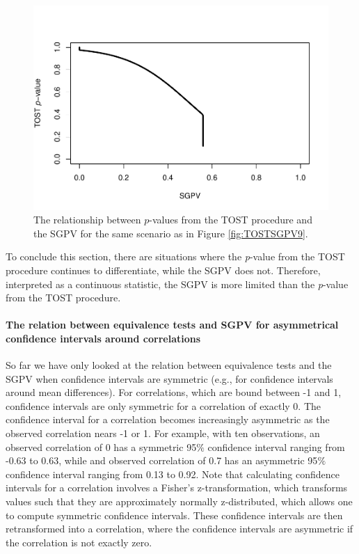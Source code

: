 \documentclass[
  english,
  man]{apa6}
\let\oldparagraph\paragraph
\renewcommand{\paragraph}[1]{\oldparagraph{#1}\mbox{}}
\begin{document}
\begin{figure}

{\centering \includegraphics[height=0.94\textheight]{chp5_format-Rmd_bib_files/figure-latex/TOSTSGPV10-1} 

}

\caption{The relationship between $p$-values from the TOST procedure and the SGPV for the same scenario as in Figure \ref{fig:TOSTSGPV9}.}\label{fig:TOSTSGPV10}
\end{figure}

To conclude this section, there are situations where the \emph{p}-value from the TOST procedure continues to differentiate, while the SGPV does not. Therefore, interpreted as a continuous statistic, the SGPV is more limited than the \emph{p}-value from the TOST procedure.

\hypertarget{the-relation-between-equivalence-tests-and-sgpv-for-asymmetrical-confidence-intervals-around-correlations}{%
\paragraph{The relation between equivalence tests and SGPV for asymmetrical confidence intervals around correlations}\label{the-relation-between-equivalence-tests-and-sgpv-for-asymmetrical-confidence-intervals-around-correlations}}

So far we have only looked at the relation between equivalence tests and the SGPV when confidence intervals are symmetric (e.g., for confidence intervals around mean differences). For correlations, which are bound between -1 and 1, confidence intervals are only symmetric for a correlation of exactly 0. The confidence interval for a correlation becomes increasingly asymmetric as the observed correlation nears -1 or 1. For example, with ten observations, an observed correlation of 0 has a symmetric 95\(\%\) confidence interval ranging from -0.63 to 0.63, while and observed correlation of 0.7 has an asymmetric 95\(\%\) confidence interval ranging from 0.13 to 0.92. Note that calculating confidence intervals for a correlation involves a Fisher's z-transformation, which transforms values such that they are approximately normally z-distributed, which allows one to compute symmetric confidence intervals. These confidence intervals are then retransformed into a correlation, where the confidence intervals are asymmetric if the correlation is not exactly zero.
\end{document}
